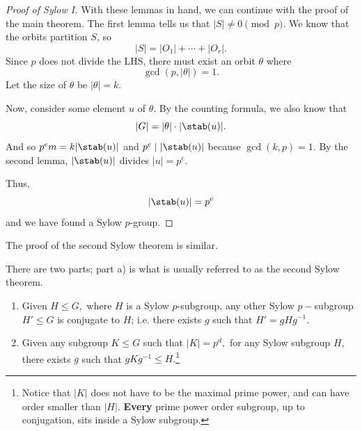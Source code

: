 \begin{proof}[Proof of Sylow I]
    With these lemmas in hand, we can continue with the proof of the main theorem. The first lemma tells us that $|S| \neq 0 \pmod{p}$. We know that the orbits partition $S$, so \[|S| = |O_1| + \cdots + |O_r|.\] Since $p$ does not divide the LHS, there must exist an orbit $\theta$ where \[\gcd(p, |\theta|) = 1.\] Let the size of $\theta$ be $|\theta| = k$. 
    
    Now, consider some element $u$ of $\theta$. By the counting formula, we also know that \[|G| = |\theta| \cdot \lvert\stab(u) \rvert.\] And so $p^em = k \lvert\stab(u)\rvert$ and $p^e \mid \lvert\stab(u)\rvert$ because $\gcd(k, p) = 1$. 
    By the second lemma, $\lvert\stab(u)\rvert$ divides $|u| = p^e$.

    Thus, \[\lvert\stab(u)\rvert = p^e\] and we have found a Sylow $p$-group.
\end{proof}

The proof of the second Sylow theorem is similar. 


\begin{theorem}[Sylow II]
There are two parts; part a) is what is usually referred to as the second Sylow theorem.

\begin{enumerate}[label = (\alph*)]
    \item Given $H \leq G,$ where $H$ is a Sylow $p$-subgroup, any other Sylow $p-$subgroup $H' \leq G$ is conjugate to $H$; i.e. there exists $g$ such that $H' = gHg^{-1}$.
    
    \item Given any subgroup $K \leq G$ such that $|K| = p^d,$ for any Sylow subgroup $H,$ there exists $g$ such that $gKg^{-1} \leq H.$\footnote{Notice that $|K|$ does not have to be the maximal prime power, and can have order smaller than $|H|.$ \textbf{Every} prime power order subgroup, up to conjugation, sits inside a Sylow subgroup.}
\end{enumerate}
\end{theorem}

